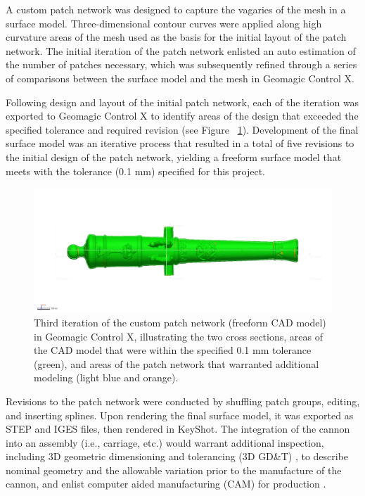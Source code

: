 \documentclass[review]{elsarticle}
\begin{document}
A custom patch network was designed to capture the vagaries of the mesh in a surface model. Three-dimensional contour curves were applied along high curvature areas of the mesh used as the basis for the initial layout of the patch network. The initial iteration of the patch network enlisted an auto estimation of the number of patches necessary, which was subsequently refined through a series of comparisons between the surface model and the mesh in Geomagic Control X.

Following design and layout of the initial patch network, each of the iteration was exported to Geomagic Control X to identify areas of the design that exceeded the specified tolerance and required revision (see Figure ~\ref{fig:Fig4}). Development of the final surface model was an iterative process that resulted in a total of five revisions to the initial design of the patch network, yielding a freeform surface model that meets with the tolerance (0.1 mm) specified for this project.

\begin{figure}[ht]\centering
\includegraphics[width=\linewidth]{FigCanDev}
\caption{Third iteration of the custom patch network (freeform CAD model) in Geomagic Control X, illustrating the two cross sections, areas of the CAD model that were within the specified 0.1 mm tolerance (green), and areas of the patch network that warranted additional modeling (light blue and orange).}
\label{fig:Fig4}
\end{figure}

Revisions to the patch network were conducted by shuffling patch groups, editing, and inserting splines. Upon rendering the final surface model, it was exported as STEP and IGES files, then rendered in KeyShot. The integration of the cannon into an assembly (i.e., carriage, etc.) would warrant additional inspection, including 3D geometric dimensioning and tolerancing (3D GD\&T) \citep{RN5875,RN5874,RN5876}, to describe nominal geometry and the allowable variation prior to the manufacture of the cannon, and enlist computer aided manufacturing (CAM) for production \citep{RN5877,RN5878}.
\end{document}
